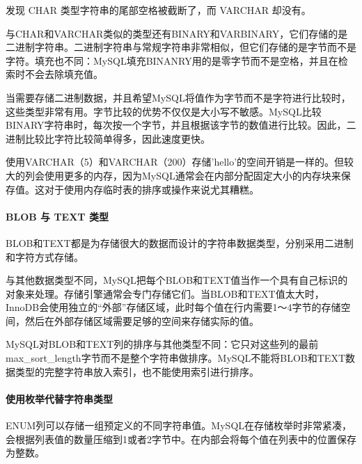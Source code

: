 发现 CHAR 类型字符串的尾部空格被截断了，而 VARCHAR 却没有。

与CHAR和VARCHAR类似的类型还有BINARY和VARBINARY，它们存储的是二进制字符串。二进制字符串与常规字符串非常相似，但它们存储的是字节而不是字符。填充也不同：MySQL填充BINANRY用的是零字节而不是空格，并且在检索时不会去除填充值。

当需要存储二进制数据，并且希望MySQL将值作为字节而不是字符进行比较时，这些类型非常有用。字节比较的优势不仅仅是大小写不敏感。MySQL比较BINARY字符串时，每次按一个字节，并且根据该字节的数值进行比较。因此，二进制比较比字符比较简单得多，因此速度更快。

使用VARCHAR（5）和VARCHAR（200）存储'hello'的空间开销是一样的。但较大的列会使用更多的内存，因为MySQL通常会在内部分配固定大小的内存块来保存值。这对于使用内存临时表的排序或操作来说尤其糟糕。

\paragraph*{BLOB 与 TEXT 类型}

BLOB和TEXT都是为存储很大的数据而设计的字符串数据类型，分别采用二进制和字符方式存储。

与其他数据类型不同，MySQL把每个BLOB和TEXT值当作一个具有自己标识的对象来处理。存储引擎通常会专门存储它们。当BLOB和TEXT值太大时，InnoDB会使用独立的“外部”存储区域，此时每个值在行内需要1～4字节的存储空间，然后在外部存储区域需要足够的空间来存储实际的值。

MySQL对BLOB和TEXT列的排序与其他类型不同：它只对这些列的最前max\_sort\_length字节而不是整个字符串做排序。MySQL不能将BLOB和TEXT数据类型的完整字符串放入索引，也不能使用索引进行排序。


\paragraph*{使用枚举代替字符串类型}

ENUM列可以存储一组预定义的不同字符串值。MySQL在存储枚举时非常紧凑，会根据列表值的数量压缩到1或者2字节中。在内部会将每个值在列表中的位置保存为整数。

